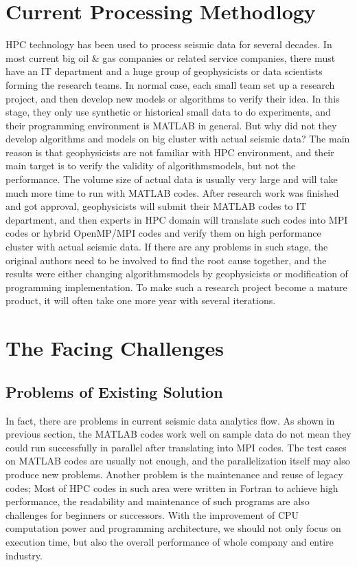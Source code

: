 \section{Current Processing Methodlogy}
HPC technology has been used to process seismic data for several decades. In most current big oil \& gas companies or related service companies, there must have an IT department and a huge group of geophysicists or data scientists forming the research teams. In normal case, each small team set up a research project, and then develop new models or algorithms to verify their idea. In this stage, they only use synthetic or historical small data to do experiments, and their programming environment is MATLAB in general. But why did not they develop algorithms and models on big cluster with actual seismic data? The main reason is that geophysicists are not familiar with HPC environment, and their main target is to verify the validity of algorithms\/models, but not the performance. The volume size of actual data is usually very large and will take much more time to run with MATLAB codes. After research work was finished and got approval, geophysicists will submit their MATLAB codes to IT department, and then experts in HPC domain will translate such codes into MPI codes or hybrid OpenMP/MPI codes and verify them on high performance cluster with actual seismic data. If there are any problems in such stage, the original authors need to be involved to find the root cause together, and the results were either changing algorithms\/models by geophysicists or modification of programming implementation. To make such a research project become a mature product, it will often take one more year with several iterations.



\section{The Facing Challenges}

\subsection{Problems of Existing Solution}
In fact, there are problems in current seismic data analytics flow. As shown in previous section, the MATLAB codes work well on sample data do not mean they could run successfully in parallel after translating into MPI codes. The test cases on MATLAB codes are usually not enough, and the parallelization itself may also produce new problems.
Another problem is the maintenance and reuse of legacy codes; Most of HPC codes in such area were written in Fortran to achieve high performance, the readability and maintenance of such programs are also challenges for beginners or successors. With the improvement of CPU computation power and programming architecture, we should not only focus on execution time, but also the overall performance of whole company and entire industry. 

